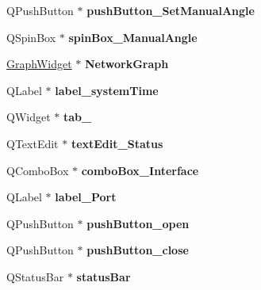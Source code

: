 \begin{DoxyCompactItemize}
Q\+Push\+Button $\ast$ {\bfseries push\+Button\+\_\+\+Set\+Manual\+Angle}
\item 
\mbox{\label{class_ui___main_window_a19ea1b981ba0c7bba868368b433b663d}} 
Q\+Spin\+Box $\ast$ {\bfseries spin\+Box\+\_\+\+Manual\+Angle}
\item 
\mbox{\label{class_ui___main_window_a0e7f42808c8a5f405dce47e59146de82}} 
\mbox{\hyperlink{class_graph_widget}{Graph\+Widget}} $\ast$ {\bfseries Network\+Graph}
\item 
\mbox{\label{class_ui___main_window_a0dfc6f5d58e950a6a43fbacc42245700}} 
Q\+Label $\ast$ {\bfseries label\+\_\+system\+Time}
\item 
\mbox{\label{class_ui___main_window_ab5ec86fcc2261f469efb01875360f67d}} 
Q\+Widget $\ast$ {\bfseries tab\+\_}
\item 
\mbox{\label{class_ui___main_window_ad8bc291eafac04aafcdb61a85dcd9cca}} 
Q\+Text\+Edit $\ast$ {\bfseries text\+Edit\+\_\+\+Status}
\item 
\mbox{\label{class_ui___main_window_ab89fdfd663016afa53c81b67c9b87f82}} 
Q\+Combo\+Box $\ast$ {\bfseries combo\+Box\+\_\+\+Interface}
\item 
\mbox{\label{class_ui___main_window_a9132451ed240090c28a1758720d1e17a}} 
Q\+Label $\ast$ {\bfseries label\+\_\+\+Port}
\item 
\mbox{\label{class_ui___main_window_adae231c0d0ffe77277d60a8eb752e8e4}} 
Q\+Push\+Button $\ast$ {\bfseries push\+Button\+\_\+open}
\item 
\mbox{\label{class_ui___main_window_a87c98c7f60e0053683aa1bacf7089905}} 
Q\+Push\+Button $\ast$ {\bfseries push\+Button\+\_\+close}
\item 
\mbox{\label{class_ui___main_window_aca960722acf385155a08ae40c2e529f0}} 
Q\+Status\+Bar $\ast$ {\bfseries status\+Bar}
\item 
\mbox{\label{class_ui___main_window_afedff75045c61dcd98b88504512ad105}} 

\end{DoxyCompactItemize}

